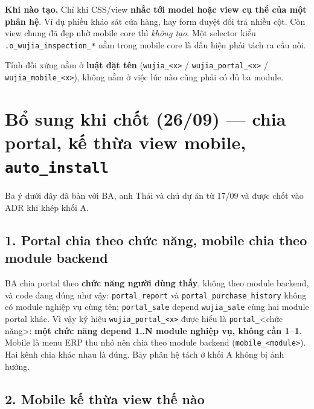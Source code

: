 \textbf{Khi nào tạo.} Chỉ khi CSS/view \textbf{nhắc tới model hoặc view cụ thể của một phân hệ}.
Ví dụ phiếu khảo sát cửa hàng, hay form duyệt đổi trả nhiều cột. Còn view chung đã đẹp nhờ mobile
core thì \emph{không tạo}. Một selector kiểu \texttt{.o\_wujia\_inspection\_*} nằm trong mobile
core là dấu hiệu phải tách ra cầu nối.

Tính đối xứng nằm ở \textbf{luật đặt tên} (\texttt{wujia\_<x>} / \texttt{wujia\_portal\_<x>} /
\texttt{wujia\_mobile\_<x>}), không nằm ở việc lúc nào cũng phải có đủ ba module.

\section{Bổ sung khi chốt (26/09) --- chia portal, kế thừa view mobile, \texttt{auto\_install}}
\label{sec:adr27-addendum}

Ba ý dưới đây đã bàn với BA, anh Thái và chủ dự án từ 17/09 và được chốt vào ADR khi khép khối A.

\subsection*{1. Portal chia theo chức năng, mobile chia theo module backend}

BA chia portal theo \textbf{chức năng người dùng thấy}, không theo module backend, và code đang đúng như vậy:
\texttt{portal\_report} và \texttt{portal\_purchase\_history} không có module nghiệp vụ cùng tên;
\texttt{portal\_sale} depend \texttt{wujia\_sale} cùng hai module portal khác. Vì vậy ký hiệu
\texttt{wujia\_portal\_<x>} được hiểu là \texttt{portal\_}<chức năng>: \textbf{một chức năng depend 1..N module nghiệp vụ,
không cần 1--1}. Mobile là menu ERP thu nhỏ nên chia theo module backend
(\texttt{mobile\_<module>}). Hai kênh chia khác nhau là đúng. Bảy phân hệ tách ở khối A không bị ảnh hưởng.

\subsection*{2. Mobile kế thừa view thế nào}

